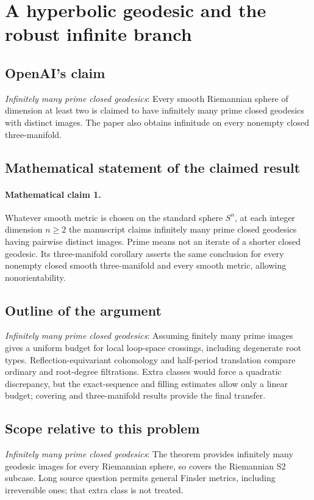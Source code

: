 \documentclass[11pt]{article}
\begin{document}
\section*{A hyperbolic geodesic and the robust infinite branch}

\subsection{OpenAI's claim}
\textit{Infinitely many prime closed geodesics}: Every smooth Riemannian sphere of dimension at least two is claimed to have infinitely many prime closed geodesics with distinct images. The paper also obtains infinitude on every nonempty closed three-manifold.

\subsection{Mathematical statement of the claimed result}
\paragraph{Mathematical claim 1.} Whatever smooth metric is chosen on the standard sphere $S^n$, at each integer dimension $n\ge2$ the manuscript claims infinitely many prime closed geodesics having pairwise distinct images. Prime means not an iterate of a shorter closed geodesic. Its three-manifold corollary asserts the same conclusion for every nonempty closed smooth three-manifold and every smooth metric, allowing nonorientability.

\subsection{Outline of the argument}
\textit{Infinitely many prime closed geodesics}: Assuming finitely many prime images gives a uniform budget for local loop-space crossings, including degenerate root types. Reflection-equivariant cohomology and half-period translation compare ordinary and root-degree filtrations. Extra classes would force a quadratic discrepancy, but the exact-sequence and filling estimates allow only a linear budget; covering and three-manifold results provide the final transfer.

\subsection{Scope relative to this problem}
\textit{Infinitely many prime closed geodesics}: The theorem provides infinitely many geodesic images for every Riemannian sphere, so covers the Riemannian S2 subcase. Long source question permits general Finsler metrics, including irreversible ones; that extra class is not treated.
\end{document}
